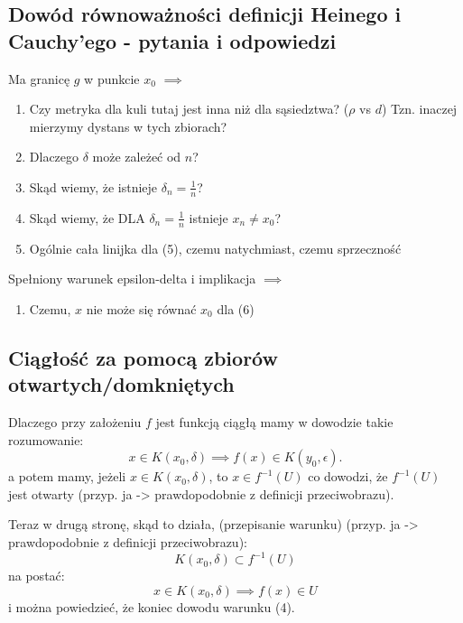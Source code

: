 \documentclass{article}
\begin{document}
\subsection{Dowód równoważności definicji Heinego i Cauchy'ego - pytania i odpowiedzi}

Ma granicę \(g\) w punkcie \(x_0\) \(\implies\)

\begin{enumerate}
    \item Czy metryka dla kuli tutaj jest inna niż dla sąsiedztwa? (\(\rho\) vs \(d\)) Tzn. inaczej mierzymy dystans w tych zbiorach?
    \item Dlaczego \(\delta\) może zależeć od \(n\)?
    \item Skąd wiemy, że istnieje \(\delta_n = \frac{1}{n}\)?
    \item Skąd wiemy, że DLA \(\delta_n = \frac{1}{n}\) istnieje \(x_n \neq x_0\)?
    \item Ogólnie cała linijka dla (5), czemu natychmiast, czemu sprzeczność
\end{enumerate}

Spełniony warunek epsilon-delta i implikacja \(\implies\)

\begin{enumerate}
    \item Czemu, \(x\) nie może się równać \(x_0\) dla (6)
\end{enumerate}

\subsection{Ciągłość za pomocą zbiorów otwartych/domkniętych}

Dlaczego przy założeniu \(f\) jest funkcją ciągłą mamy w dowodzie takie rozumowanie:
\begin{equation*}
    x \in K(x_0, \delta) \implies f(x) \in K(y_0, \epsilon).
\end{equation*}
a potem mamy, jeżeli \(x \in K(x_0, \delta)\), to \(x \in f^{-1}(U)\) co dowodzi, że \(f^{-1}(U)\)
jest otwarty (przyp. ja -> prawdopodobnie z definicji przeciwobrazu).\par
%
Teraz w drugą stronę, skąd to działa, (przepisanie warunku) (przyp. ja -> prawdopodobnie z definicji przeciwobrazu):
\begin{equation*}
    K(x_0, \delta) \subset f^{-1}(U)
\end{equation*}
na postać:
\begin{equation*}
    x \in K(x_0, \delta) \implies f(x) \in U
\end{equation*}
i można powiedzieć, że koniec dowodu warunku (4).
\end{document}
